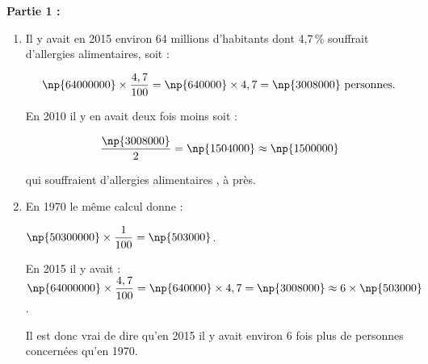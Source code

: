 
\medskip

%
%
%
%
%

\textbf{Partie 1 :}

\medskip

\begin{enumerate}
\item %
Il y avait en 2015 environ 64 millions d’habitants dont 4,7\,\%  souffrait d'allergies alimentaires, soit :

\[\np{64000000}\times \dfrac{4,7}{100} = \np{640000} \times 4,7 = \np{3008000}~\text{personnes}.\]

En 2010 il y en avait deux fois moins soit :

\[\dfrac{\np{3008000}}{2} = \np{1504000}\approx \np{1500000}\]

qui souffraient d'allergies alimentaires , à  près.

\item %
En 1970 le même calcul donne :

$\np{50300000} \times \dfrac{1}{100} = \np{503000}$.

En 2015 il y avait : $\np{64000000} \times \dfrac{4,7}{100} = \np{640000} \times 4,7 = \np{3008000} \approx 6 \times \np{503000}$.

Il est donc vrai de dire  qu'en 2015 il y avait environ 6 fois plus de personnes concernées qu'en 1970.
\end{enumerate}

